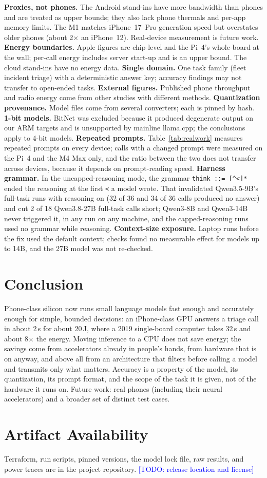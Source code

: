 \documentclass[conference]{IEEEtran}
\newcommand{\todo}[1]{\textcolor{blue}{[TODO: #1]}}
\begin{document}
\textbf{Proxies, not phones.} The Android stand-ins have more bandwidth than phones and are treated as upper bounds; they also lack phone thermals and per-app memory limits. The M1 matches iPhone~17~Pro generation speed but overstates older phones (about 2$\times$ an iPhone~12). Real-device measurement is future work. \textbf{Energy boundaries.} Apple figures are chip-level and the Pi~4's whole-board at the wall; per-call energy includes server start-up and is an upper bound. The cloud stand-ins have no energy data. \textbf{Single domain.} One task family (fleet incident triage) with a deterministic answer key; accuracy findings may not transfer to open-ended tasks. \textbf{External figures.} Published phone throughput and radio energy come from other studies with different methods. \textbf{Quantization provenance.} Model files come from several converters; each is pinned by hash. \textbf{1-bit models.} BitNet was excluded because it produced degenerate output on our ARM targets and is unsupported by mainline llama.cpp; the conclusions apply to 4-bit models. \textbf{Repeated prompts.} Table~\ref{tab:realwork} measures repeated prompts on every device; calls with a changed prompt were measured on the Pi~4 and the M4 Max only, and the ratio between the two does not transfer across devices, because it depends on prompt-reading speed. \textbf{Harness grammar.} In the uncapped-reasoning mode, the grammar \texttt{think ::= [\textasciicircum<]*} ended the reasoning at the first \texttt{<} a model wrote. That invalidated Qwen3.5-9B's full-task runs with reasoning on (32 of 36 and 34 of 36 calls produced no answer) and cut 2 of 18 Qwen3.8-27B full-task calls short; Qwen3-8B and Qwen3-14B never triggered it, in any run on any machine, and the capped-reasoning runs used no grammar while reasoning. \textbf{Context-size exposure.} Laptop runs before the fix used the default context; checks found no measurable effect for models up to 14B, and the 27B model was not re-checked.

\section{Conclusion}

Phone-class silicon now runs small language models fast enough and accurately enough for simple, bounded decisions: an iPhone-class GPU answers a triage call in about 2\,s for about 20\,J, where a 2019 single-board computer takes 32\,s and about 8$\times$ the energy. Moving inference to a CPU does not save energy; the savings come from accelerators already in people's hands, from hardware that is on anyway, and above all from an architecture that filters before calling a model and transmits only what matters. Accuracy is a property of the model, its quantization, its prompt format, and the scope of the task it is given, not of the hardware it runs on. Future work: real phones (including their neural accelerators) and a broader set of distinct test cases.

\section*{Artifact Availability}
Terraform, run scripts, pinned versions, the model lock file, raw results, and power traces are in the project repository. \todo{release location and license}



\end{document}

